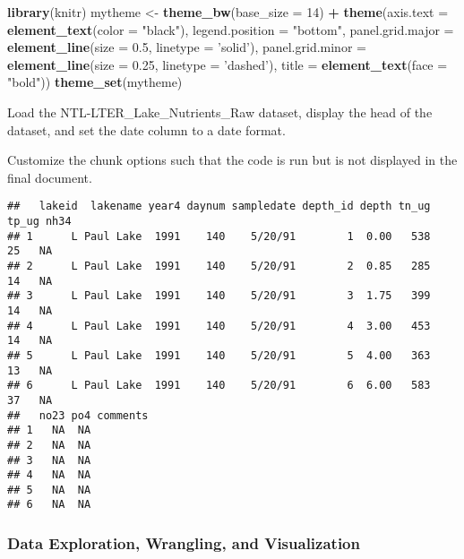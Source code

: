 \documentclass[]{article}
\newenvironment{Shaded}{\begin{snugshade}}{\end{snugshade}}
\newcommand{\KeywordTok}[1]{\textcolor[rgb]{0.13,0.29,0.53}{\textbf{#1}}}
\newcommand{\DataTypeTok}[1]{\textcolor[rgb]{0.13,0.29,0.53}{#1}}
\newcommand{\DecValTok}[1]{\textcolor[rgb]{0.00,0.00,0.81}{#1}}
\newcommand{\FloatTok}[1]{\textcolor[rgb]{0.00,0.00,0.81}{#1}}
\newcommand{\StringTok}[1]{\textcolor[rgb]{0.31,0.60,0.02}{#1}}
\newcommand{\OperatorTok}[1]{\textcolor[rgb]{0.81,0.36,0.00}{\textbf{#1}}}
\newcommand{\NormalTok}[1]{#1}
\begin{document}
\begin{Shaded}
\begin{Highlighting}[]
\KeywordTok{library}\NormalTok{(knitr)}
\NormalTok{mytheme <-}\StringTok{ }\KeywordTok{theme_bw}\NormalTok{(}\DataTypeTok{base_size =} \DecValTok{14}\NormalTok{) }\OperatorTok{+}
\StringTok{  }\KeywordTok{theme}\NormalTok{(}\DataTypeTok{axis.text =} \KeywordTok{element_text}\NormalTok{(}\DataTypeTok{color =} \StringTok{"black"}\NormalTok{), }
        \DataTypeTok{legend.position =} \StringTok{"bottom"}\NormalTok{,}
        \DataTypeTok{panel.grid.major =} \KeywordTok{element_line}\NormalTok{(}\DataTypeTok{size =} \FloatTok{0.5}\NormalTok{, }\DataTypeTok{linetype =} \StringTok{'solid'}\NormalTok{), }
        \DataTypeTok{panel.grid.minor =} \KeywordTok{element_line}\NormalTok{(}\DataTypeTok{size =} \FloatTok{0.25}\NormalTok{, }\DataTypeTok{linetype =} \StringTok{'dashed'}\NormalTok{),}
        \DataTypeTok{title =} \KeywordTok{element_text}\NormalTok{(}\DataTypeTok{face =} \StringTok{"bold"}\NormalTok{))}
\KeywordTok{theme_set}\NormalTok{(mytheme)}
\end{Highlighting}
\end{Shaded}

Load the NTL-LTER\_Lake\_Nutrients\_Raw dataset, display the head of the
dataset, and set the date column to a date format.

Customize the chunk options such that the code is run but is not
displayed in the final document.

\begin{verbatim}
##   lakeid  lakename year4 daynum sampledate depth_id depth tn_ug tp_ug nh34
## 1      L Paul Lake  1991    140    5/20/91        1  0.00   538    25   NA
## 2      L Paul Lake  1991    140    5/20/91        2  0.85   285    14   NA
## 3      L Paul Lake  1991    140    5/20/91        3  1.75   399    14   NA
## 4      L Paul Lake  1991    140    5/20/91        4  3.00   453    14   NA
## 5      L Paul Lake  1991    140    5/20/91        5  4.00   363    13   NA
## 6      L Paul Lake  1991    140    5/20/91        6  6.00   583    37   NA
##   no23 po4 comments
## 1   NA  NA         
## 2   NA  NA         
## 3   NA  NA         
## 4   NA  NA         
## 5   NA  NA         
## 6   NA  NA
\end{verbatim}

\subsubsection{Data Exploration, Wrangling, and
Visualization}\label{data-exploration-wrangling-and-visualization}
\end{document}
